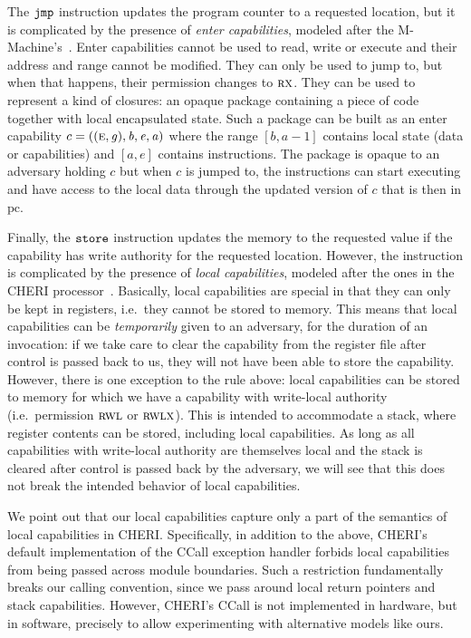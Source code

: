 \documentclass[format=acmsmall, review=true, screen=true]{acmart}
\newcommand\lau[1]{{\color{purple} \sf \footnotesize {LS: #1}}\\}
\newcommand\dominique[1]{{\color{purple} \sf \footnotesize {DD: #1}}\\}
\renewcommand\lau[1]{}
\renewcommand\dominique[1]{}
\newcommand{\var}[1]{\mathit{#1}}
\newcommand{\gl}{\var{g}}
\newcommand{\pcreg}{\mathrm{pc}}
\newcommand{\addr}{\var{a}}
\newcommand{\start}{\var{b}}
\newcommand{\addrend}{\var{e}}
\newcommand{\zinstr}[1]{\mathtt{#1}}
\newcommand{\oneinstr}[2]{
  \ifthenelse{\equal{#2}{}}
  {\zinstr{#1}}
  {\zinstr{#1} \; #2}
}
\newcommand{\jmp}[1]{\oneinstr{jmp}{#1}}
\newcommand{\twoinstr}[3]{
  \ifthenelse{\equal{#2#3}{}}
  {\zinstr{#1}}
  {\zinstr{#1} \; #2 \; #3}
}
\newcommand{\store}[2]{\twoinstr{store}{#1}{#2}}
\newcommand{\plainperm}[1]{\textsc{#1}}
\newcommand{\exec}{\plainperm{rx}}
\newcommand{\entry}{\plainperm{e}}
\newcommand{\readwritel}{\plainperm{rwl}}
\newcommand{\rwl}{\readwritel}
\newcommand{\rwlx}{\plainperm{rwlx}}
\begin{document}
The $\jmp{}$ instruction updates the program counter to a requested location,
but it is complicated by the presence of \emph{enter capabilities}, modeled
after the M-Machine's~\citep{Carter:1994:HSF:195473.195579}. Enter capabilities
cannot be used to read, write or execute and their address and range cannot be
modified. They can only be used to jump to, but when that happens, their
permission changes to $\exec$. They can be used to represent a kind of closures:
an opaque package containing a piece of code together with local encapsulated
state. Such a package can be built as an enter capability $c =
((\entry,\gl),\start,\addrend,\addr)$ where the range $[\start,\addr-1]$
contains local state (data or capabilities) and $[\addr,\addrend]$ contains
instructions. The package is opaque to an adversary holding $c$ but when $c$ is
jumped to, the instructions can start executing and have access to the local
data through the updated version of $c$ that is then in $\pcreg$. 
\lau{As we talked about what is described here, is not how we make closures in
the TR, so we should consider whether we should refrain from using that word
here. }

Finally, the $\store{}{}$ instruction updates the memory to the requested value
if the capability has write authority for the requested location. However, the
instruction is complicated by the presence of \emph{local capabilities}, modeled
after the ones in the CHERI processor~\citep{Watson2015Cheri}. Basically, local
capabilities are special in that they can only be kept in registers, i.e.\ they
cannot be stored to memory. This means that local capabilities can be
\emph{temporarily} given to an adversary, for the duration of an invocation: if
we take care to clear the capability from the register file after control is
passed back to us, they will not have been able to store the capability.
However, there is one exception to the rule above: local capabilities can be
stored to memory for which we have a capability with write-local authority
(i.e.\ permission $\rwl$ or $\rwlx$). This is intended to accommodate a stack,
where register contents can be stored, including local capabilities. As long as
all capabilities with write-local authority are themselves local and the stack
is cleared after control is passed back by the adversary, we will see that this
does not break the intended behavior of local capabilities.

We point out that our local capabilities capture only a part of the semantics of
local capabilities in CHERI. Specifically, in addition to the above, CHERI's
default implementation of the CCall exception handler forbids local capabilities
from being passed across module boundaries. Such a restriction fundamentally
breaks our calling convention, since we pass around local return pointers and
stack capabilities. However, CHERI's CCall is not implemented in hardware, but
in software, precisely to allow experimenting with alternative models like ours.
\dominique{Update to CHERI's new ccall story.}
\end{document}
